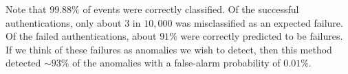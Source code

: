 \documentclass[aps, prd, amsmath, floats, floatfix, superscriptaddress,
nofootinbib,eqsecnum]{revtex4}
\begin{document}
Note that $99.88\%$ of events were correctly classified. Of the successful authentications, only about $3$ in $10,000$
was misclassified as an expected failure. Of the failed authentications, about $91\%$ were correctly predicted to be failures.
If we think of these failures as anomalies we wish to detect, then this method detected $\sim 93\%$ of the anomalies
with a false-alarm probability of $0.01\%$.



\end{document}
